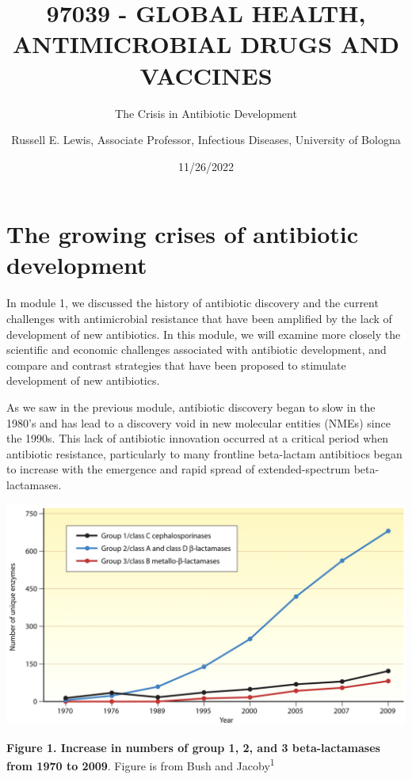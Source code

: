 \documentclass[
]{book}
\title{97039 - GLOBAL HEALTH, ANTIMICROBIAL DRUGS AND VACCINES}
\subtitle{The Crisis in Antibiotic Development}
\author{Russell E. Lewis, Associate Professor, Infectious Diseases, University of Bologna}
\date{11/26/2022}
\begin{document}
\maketitle

{
\setcounter{tocdepth}{1}
\tableofcontents
}
\hypertarget{the-growing-crises-of-antibiotic-development}{%
\section*{The growing crises of antibiotic development}\label{the-growing-crises-of-antibiotic-development}}

In module 1, we discussed the history of antibiotic discovery and the current challenges with antimicrobial resistance that have been amplified by the lack of development of new antibiotics. In this module, we will examine more closely the scientific and economic challenges associated with antibiotic development, and compare and contrast strategies that have been proposed to stimulate development of new antibiotics.

As we saw in the previous module, antibiotic discovery began to slow in the 1980's and has lead to a discovery void in new molecular entities (NMEs) since the 1990s. This lack of antibiotic innovation occurred at a critical period when antibiotic resistance, particularly to many frontline beta-lactam antibitiocs began to increase with the emergence and rapid spread of extended-spectrum beta-lactamases.

\includegraphics[width=8.33333in,height=\textheight]{images/betalactamases.png}

\textbf{Figure 1. Increase in numbers of group 1, 2, and 3 beta-lactamases from 1970 to 2009}. Figure is from Bush and Jacoby\textsuperscript{1}
\end{document}

